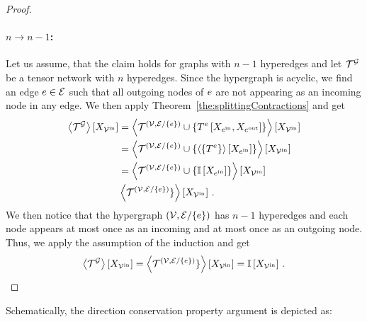 \begin{proof}
	\paragraph{$n\rightarrow n-1$:} Let us assume, that the claim holds for graphs with $n-1$ hyperedges and let $\mathcal{T}^{\mathcal{G}}$ be a tensor network with $n$ hyperedges.
	Since the hypergraph is acyclic, we find an edge $e\in\mathcal{E}$ such that all outgoing nodes of $e$ are not appearing as an incoming node in any edge. 
	We then apply Theorem~\ref{the:splittingContractions} and get
	\begin{align*}
		\left\langle \mathcal{T}^{\mathcal{G}}\right\rangle \left[ X_{\mathcal{V}^{\mathrm{in}}} \right] 
		&= \left\langle 
			\mathcal{T}^{(\mathcal{V},\mathcal{E}/\{e\})} \cup \{T^{e}\left[X_{e^{\mathrm{in}}},X_{e^{\mathrm{out}}}\right]\}
			\right\rangle \left[ X_{\mathcal{V}^{\mathrm{in}}} \right] \\
		& = \left\langle 
			\mathcal{T}^{(\mathcal{V},\mathcal{E}/\{e\})} \cup \{\left\langle \left\{T^{e}\right\}\right\rangle \left[ X_{e^{\mathrm{in}}} \right] \}
			\right\rangle \left[ X_{\mathcal{V}^{\mathrm{in}}} \right] \\
		& = \left\langle 
			\mathcal{T}^{(\mathcal{V},\mathcal{E}/\{e\})} \cup \{\mathbb{I}\left[X_{e^{\mathrm{in}}}\right] \}
			\right\rangle \left[ X_{\mathcal{V}^{\mathrm{in}}} \right] \\
		& \left\langle 
			\mathcal{T}^{(\mathcal{V},\mathcal{E}/\{e\})} \}
			\right\rangle \left[ X_{\mathcal{V}^{\mathrm{in}}} \right] \, . 
	\end{align*}
	We then notice that the hypergraph $(\mathcal{V},\mathcal{E}/\{e\})$ has $n-1$ hyperedges and each node appears at most once as an incoming and at most once as an outgoing node.
	Thus, we apply the assumption of the induction and get
	\begin{align*}
		\left\langle \mathcal{T}^{\mathcal{G}}\right\rangle \left[ X_{\mathcal{V}^{\mathrm{in}}} \right] = \left\langle 
			\mathcal{T}^{(\mathcal{V},\mathcal{E}/\{e\})} \}
			\right\rangle \left[ X_{\mathcal{V}^{\mathrm{in}}} \right] = \mathbb{I}\left[X_{\mathcal{V}^{\mathrm{in}}}\right] \, . 
	\end{align*}
	
\end{proof}


Schematically, the direction conservation property argument is depicted as:
\begin{center}
	
\end{center}


















